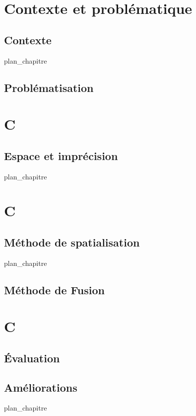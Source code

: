 \label{chap:int}


\part{Contexte et problématique}
\label{part:01}

\label{part:01:int}

\chapter{Contexte}
\label{chap:01}
{plan_chapitre}

\chapter{Problématisation}

\label{part:01:cnc}

\part{C}

\chapter{Espace et imprécision}
\label{chap:02}
{plan_chapitre}

\part{C}

\chapter{Méthode de spatialisation}
\label{chap:03}
{plan_chapitre}

\chapter{Méthode de Fusion}

\part{C}

\chapter{Évaluation}

\chapter{Améliorations}
\label{chap:04}
{plan_chapitre}

\label{chap:cnl}
